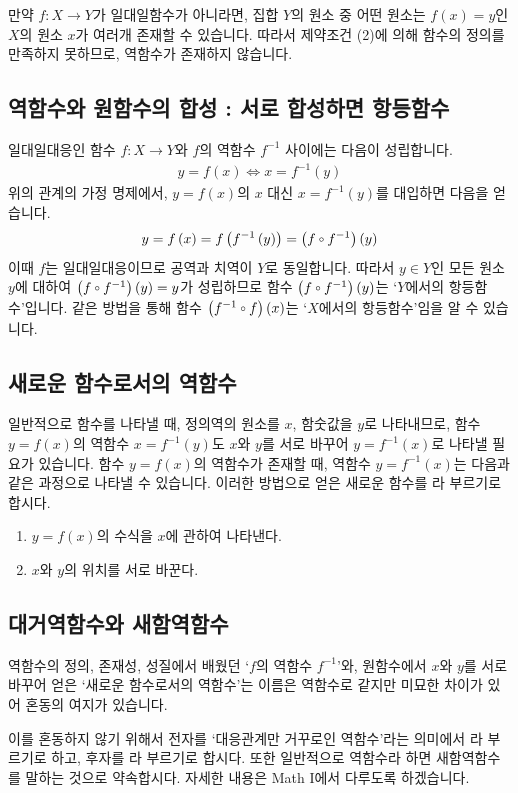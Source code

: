 만약 $f:X \longrightarrow Y$가 일대일함수가 아니라면, 집합 $Y$의 원소 중 어떤 원소는 $f(x)=y$인 $X$의 원소 $x$가 여러개 존재할 수 있습니다. 따라서 제약조건 (2)에 의해 함수의 정의를 만족하지 못하므로, 역함수가 존재하지 않습니다.

\subsection{역함수와 원함수의 합성 : 서로 합성하면 항등함수}

일대일대응인 함수 $f : X \longrightarrow Y$와 $f$의 역함수 $f^{-1}$ 사이에는 다음이 성립합니다.
\begin{align*} y= f\left( x \right)  \Longleftrightarrow x=f^{-1}\left( y \right)  \end{align*}
위의 관계의 가정 명제에서, $y=f\left( x \right) $의 $x$ 대신 $x=f^{-1}\left( y \right) $를 대입하면 다음을 얻습니다.
\begin{align*} y=f\left( x \right) =f\left( f^{-1}\left( y \right) \right) = \COMP{f}{f^{-1}}{y} \end{align*}
이때 $f$는 일대일대응이므로 공역과 치역이 $Y$로 동일합니다. 따라서 $y \in Y$인 모든 원소 $y$에 대하여 $\COMP{f}{f^{-1}}{y} = y$가 성립하므로 함수 $\COMP{f}{f^{-1}}{y}$는 `$Y$에서의 항등함수'입니다. 같은 방법을 통해 함수 $\COMP{f^{-1}}{f}{x}$는 `$X$에서의 항등함수'임을 알 수 있습니다.

\subsection{새로운 함수로서의 역함수}

일반적으로 함수를 나타낼 때, 정의역의 원소를 $x$, 함숫값을 $y$로 나타내므로, 함수 $y=f(x)$의 역함수 $x=f^{-1}\left( y \right) $도 $x$와 $y$를 서로 바꾸어 $y=f^{-1}\left( x \right) $로 나타낼 필요가 있습니다. 함수 $y=f\left( x \right)$의 역함수가 존재할 때, 역함수 $y=f^{-1}\left( x \right) $는 다음과 같은 과정으로 나타낼 수 있습니다. 이러한 방법으로 얻은 새로운 함수를 라 부르기로 합시다.
\begin{justbox}
    \begin{enumerate}[label={\onum*}]
        \item $y=f\left( x \right) $의 수식을 $x$에 관하여 나타낸다.
        \item $x$와 $y$의 위치를 서로 바꾼다.
    \end{enumerate}    
\end{justbox}

\subsection{대거역함수와 새함역함수}
역함수의 정의, 존재성, 성질에서 배웠던 `$f$의 역함수 $f^{-1}$'와, 원함수에서 $x$와 $y$를 서로 바꾸어 얻은 `새로운 함수로서의 역함수'는 이름은 역함수로 같지만 미묘한 차이가 있어 혼동의 여지가 있습니다.

이를 혼동하지 않기 위해서 전자를 `대응관계만 거꾸로인 역함수'라는 의미에서 라 부르기로 하고, 후자를 라 부르기로 합시다. 또한 일반적으로 역함수라 하면 새함역함수를 말하는 것으로 약속합시다. 자세한 내용은 Math I에서 다루도록 하겠습니다.
